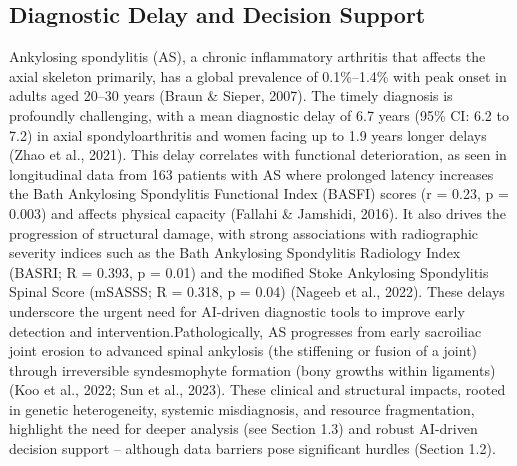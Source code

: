 \documentclass[12pt, a4paper]{article}
\begin{document}
\subsection{Diagnostic Delay and Decision Support}
Ankylosing spondylitis (AS), a chronic inflammatory arthritis that affects the axial skeleton primarily, has a global prevalence of 0.1\%–1.4\% with peak onset in adults aged 20–30 years (Braun \& Sieper, 2007). The timely diagnosis is profoundly challenging, with a mean diagnostic delay of 6.7 years (95\% CI: 6.2 to 7.2) in axial spondyloarthritis and women facing up to 1.9 years longer delays (Zhao et al., 2021). This delay correlates with functional deterioration, as seen in longitudinal data from 163 patients with AS where prolonged latency increases the Bath Ankylosing Spondylitis Functional Index (BASFI) scores (r = 0.23, p = 0.003) and affects physical capacity (Fallahi \& Jamshidi, 2016). It also drives the progression of structural damage, with strong associations with radiographic severity indices such as the Bath Ankylosing Spondylitis Radiology Index (BASRI; R = 0.393, p = 0.01) and the modified Stoke Ankylosing Spondylitis Spinal Score (mSASSS; R = 0.318, p = 0.04) (Nageeb et al., 2022). These delays underscore the urgent need for AI-driven diagnostic tools to improve early detection and intervention.Pathologically, AS progresses from early sacroiliac joint erosion to advanced spinal ankylosis (the stiffening or fusion of a joint) through irreversible syndesmophyte formation (bony growths within ligaments) (Koo et al., 2022; Sun et al., 2023). These clinical and structural impacts, rooted in genetic heterogeneity, systemic misdiagnosis, and resource fragmentation, highlight the need for deeper analysis (see Section 1.3) and robust AI-driven decision support -- although data barriers pose significant hurdles (Section 1.2).
\end{document}

